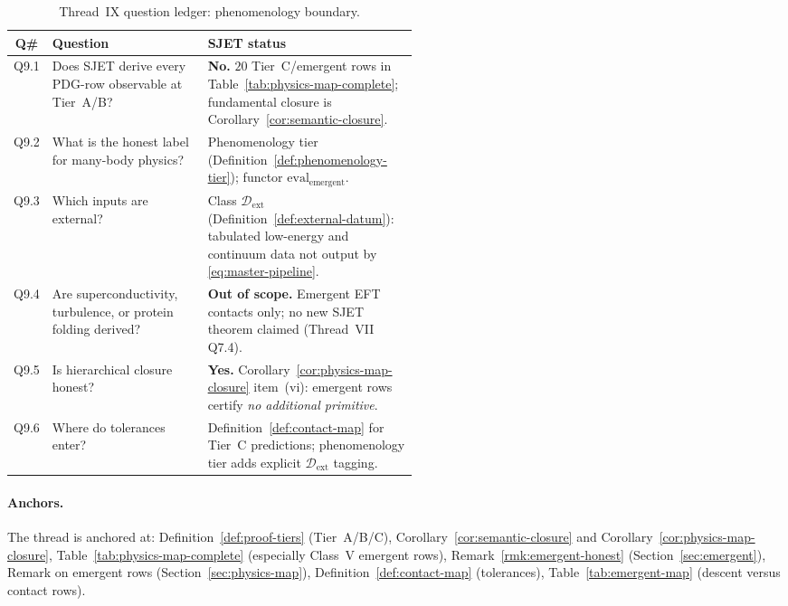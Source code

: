\begin{table}[ht]
\centering
\small
\renewcommand{\arraystretch}{1.12}
\begin{tabular}{@{}clp{0.52\linewidth}@{}}
\toprule
\textbf{Q\#} & \textbf{Question} & \textbf{SJET status} \\
\midrule
Q9.1 &
  Does SJET derive every PDG-row observable at Tier~A/B? &
  \textbf{No.} $20$ Tier~C/emergent rows in
  Table~\ref{tab:physics-map-complete}; fundamental closure is
  Corollary~\ref{cor:semantic-closure}. \\
\addlinespace
Q9.2 &
  What is the honest label for many-body physics? &
  Phenomenology tier (Definition~\ref{def:phenomenology-tier});
  functor $\mathrm{eval}_{\mathrm{emergent}}$. \\
\addlinespace
Q9.3 &
  Which inputs are external? &
  Class $\mathcal{D}_{\mathrm{ext}}$
  (Definition~\ref{def:external-datum}): tabulated low-energy and
  continuum data not output by \eqref{eq:master-pipeline}. \\
\addlinespace
Q9.4 &
  Are superconductivity, turbulence, or protein folding derived? &
  \textbf{Out of scope.} Emergent EFT contacts only; no new SJET theorem
  claimed (Thread~VII Q7.4). \\
\addlinespace
Q9.5 &
  Is hierarchical closure honest? &
  \textbf{Yes.} Corollary~\ref{cor:physics-map-closure} item~(vi):
  emergent rows certify \emph{no additional primitive}. \\
\addlinespace
Q9.6 &
  Where do tolerances enter? &
  Definition~\ref{def:contact-map} for Tier~C predictions;
  phenomenology tier adds explicit $\mathcal{D}_{\mathrm{ext}}$ tagging. \\
\bottomrule
\end{tabular}
\caption{Thread~IX question ledger: phenomenology boundary.}
\label{tab:thread-9-questions}
\end{table}

\paragraph{Anchors.}
The thread is anchored at:
Definition~\ref{def:proof-tiers} (Tier~A/B/C),
Corollary~\ref{cor:semantic-closure} and Corollary~\ref{cor:physics-map-closure},
Table~\ref{tab:physics-map-complete} (especially Class~V emergent rows),
Remark~\ref{rmk:emergent-honest} (Section~\ref{sec:emergent}),
Remark on emergent rows (Section~\ref{sec:physics-map}),
Definition~\ref{def:contact-map} (tolerances),
Table~\ref{tab:emergent-map} (descent versus contact rows).

